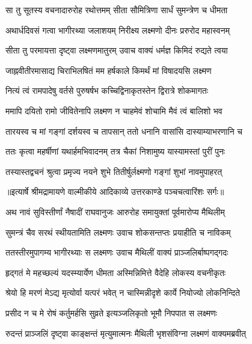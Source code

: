 \twolineshloka
{सा तु सूतस्य वचनादारुरोह रथोत्तमम्}
{सीता सौमित्रिणा सार्धं सुमन्त्रेण च धीमता} %

\twolineshloka
{अथार्धदिवसं गत्वा भागीरथ्या जलाशयम्}
{निरीक्ष्य लक्ष्मणो दीनः प्ररुरोद महास्वनम्} %

\twolineshloka
{सीता तु परमायत्ता दृष्ट्वा लक्ष्मणमातुरम्}
{उवाच वाक्यं धर्मज्ञ किमिदं रुद्यते त्वया} %

\twolineshloka
{जाह्नवीतीरमासाद्य चिराभिलषितं मम}
{हर्षकाले किमर्थं मां विषादयसि लक्ष्मण} %

\twolineshloka
{नित्यं त्वं रामपादेषु वर्तसे पुरुषर्षभ}
{कच्चिद्विनाकृतस्तेन द्विरात्रे शोकमागतः} %

\twolineshloka
{ममापि दयितो रामो जीवितेनापि लक्ष्मण}
{न चाहमेवं शोचामि मैवं त्वं बालिशो भव} %

\twolineshloka
{तारयस्व च मां गङ्गां दर्शयस्व च तापसान्}
{ततो धनानि वासांसि दास्याम्याभरणानि च} %

\twolineshloka
{ततः कृत्वा महर्षीणां यथार्हमभिवादनम्}
{तत्र चैकां निशामुष्य यास्यामस्तां पुरीं पुनः} %

\twolineshloka
{तस्यास्तद्वचनं श्रुत्वा प्रमृज्य नयने शुभे}
{तितीर्षुर्लक्ष्मणो गङ्गां शुभां नावमुपाहरत्} %


{॥इत्यार्षे श्रीमद्रामायणे वाल्मीकीये आदिकाव्ये उत्तरकाण्डे पञ्चचत्वारिंशः सर्गः॥}


\twolineshloka
{अथ नावं सुविस्तीर्णां नैषादीं राघवानुजः}
{आरुरोह समायुक्तां पूर्वमारोप्य मैथिलीम्} %

\twolineshloka
{सुमन्त्रं चैव सरथं स्थीयतामिति लक्ष्मणः}
{उवाच शोकसन्तप्तः प्रयाहीति च नाविकम्} %

\twolineshloka
{ततस्तीरमुपागम्य भागीरथ्याः स लक्ष्मणः}
{उवाच मैथिलीं वाक्यं प्राञ्जलिर्बाष्पगद्गदः} %

\twolineshloka
{हृद्गतं मे महच्छल्यं यदस्म्यार्येण धीमता}
{अस्मिन्निमित्ते वैदेहि लोकस्य वचनीकृतः} %

\twolineshloka
{श्रेयो हि मरणं मेऽद्य मृत्योर्वा यत्परं भवेत्}
{न चास्मिन्नीदृशे कार्ये नियोज्यो लोकनिन्दिते} %

\twolineshloka
{प्रसीद न च मे रोषं कर्तुमर्हसि सुव्रते}
{इत्यञ्जलिकृतो भूमौ निपपात स लक्ष्मणः} %

\twolineshloka
{रुदन्तं प्राञ्जलिं दृष्ट्वा काङ्क्षन्तं मृत्युमात्मनः}
{मैथिली भृशसंविग्ना लक्ष्मणं वाक्यमब्रवीत्} %

